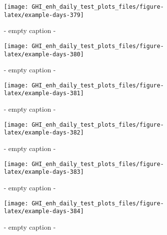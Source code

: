 \documentclass[
  10pt,
  a4paper,oneside]{article}
\begin{document}
\begin{figure}[H]

{\centering \texttt{[image: GHI\_enh\_daily\_test\_plots\_files/figure-latex/example-days-379]} 

}

\caption{ - empty caption - }\label{fig:example-days-379}
\end{figure}

\begin{figure}[H]

{\centering \texttt{[image: GHI\_enh\_daily\_test\_plots\_files/figure-latex/example-days-380]} 

}

\caption{ - empty caption - }\label{fig:example-days-380}
\end{figure}

\begin{figure}[H]

{\centering \texttt{[image: GHI\_enh\_daily\_test\_plots\_files/figure-latex/example-days-381]} 

}

\caption{ - empty caption - }\label{fig:example-days-381}
\end{figure}

\begin{figure}[H]

{\centering \texttt{[image: GHI\_enh\_daily\_test\_plots\_files/figure-latex/example-days-382]} 

}

\caption{ - empty caption - }\label{fig:example-days-382}
\end{figure}

\begin{figure}[H]

{\centering \texttt{[image: GHI\_enh\_daily\_test\_plots\_files/figure-latex/example-days-383]} 

}

\caption{ - empty caption - }\label{fig:example-days-383}
\end{figure}

\begin{figure}[H]

{\centering \texttt{[image: GHI\_enh\_daily\_test\_plots\_files/figure-latex/example-days-384]} 

}

\caption{ - empty caption - }\label{fig:example-days-384}
\end{figure}
\end{document}
